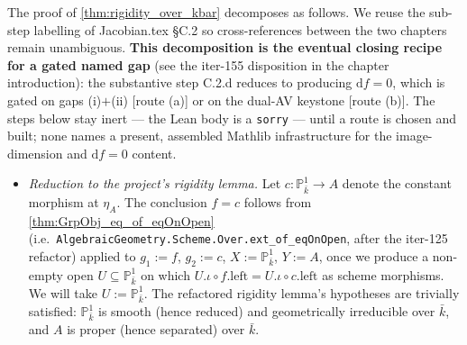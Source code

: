 The proof of \cref{thm:rigidity_over_kbar} decomposes as follows. We reuse the sub-step labelling of Jacobian.tex \S C.2 so cross-references between the two chapters remain unambiguous. \textbf{This decomposition is the eventual closing recipe for a gated named gap} (see the iter-155 disposition in the chapter introduction): the substantive step C.2.d reduces to producing \(\mathrm df = 0\), which is gated on gaps (i)\(+\)(ii) [route (a)] or on the dual-AV keystone [route (b)]. The steps below stay inert --- the Lean body is a \texttt{sorry} --- until a route is chosen and built; none names a present, assembled Mathlib infrastructure for the image-dimension and \(\mathrm df = 0\) content.

\begin{itemize}
  \item[\textbf{(C.2.b)}] \emph{Reduction to the project's rigidity lemma.} Let \(c \colon \mathbb P^1_{\bar k} \to A\) denote the constant morphism at \(\eta_A\). The conclusion \(f = c\) follows from \cref{thm:GrpObj_eq_of_eqOnOpen} (i.e.\ \texttt{AlgebraicGeometry.Scheme.Over.ext\_of\_eqOnOpen}, after the iter-125 refactor) applied to \(g_1 := f\), \(g_2 := c\), \(X := \mathbb P^1_{\bar k}\), \(Y := A\), once we produce a non-empty open \(U \subseteq \mathbb P^1_{\bar k}\) on which \(U.\iota \circ f.\mathrm{left} = U.\iota \circ c.\mathrm{left}\) as scheme morphisms. We will take \(U := \mathbb P^1_{\bar k}\). The refactored rigidity lemma's hypotheses are trivially satisfied: \(\mathbb P^1_{\bar k}\) is smooth (hence reduced) and geometrically irreducible over \(\bar k\), and \(A\) is proper (hence separated) over \(\bar k\).


\end{itemize}
